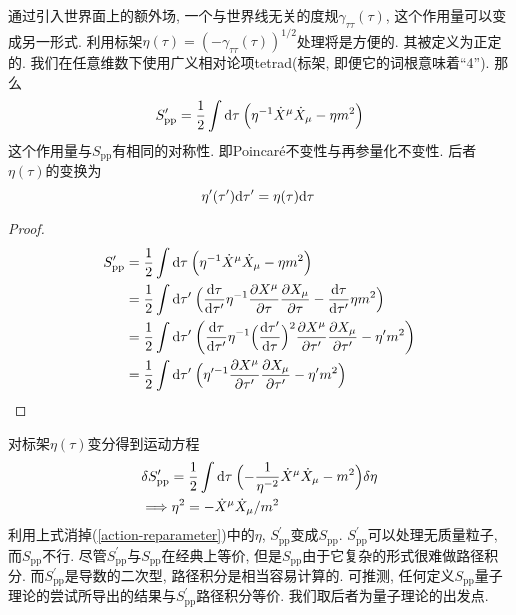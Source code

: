 通过引入世界面上的额外场, 一个与世界线无关的度规$\gamma_{\tau\tau}(\tau)$, 这个作用量可以变成另一形式. 利用标架$\eta(\tau)=(-\gamma_{\tau\tau}(\tau))^{1/2}$处理将是方便的. 其被定义为正定的. 我们在任意维数下使用广义相对论项tetrad(标架, 即便它的词根意味着``4''). 那么
\begin{equation}
S^\prime _{\mathrm{pp}}=\frac{1}{2}\int \mathrm{d}\tau\: \Bigl(\eta^{-1}\dot{X}^\mu \dot{X}_\mu-\eta m^2\Bigr) \label{action-reparameter}
\end{equation}
这个作用量与$S_{\mathrm{pp}}$有相同的对称性. 即Poincar\'{e}不变性与再参量化不变性. 后者$\eta(\tau)$的变换为
\begin{equation}
\eta^\prime(\tau^\prime)\mathrm{d}\tau^\prime=\eta(\tau)\mathrm{d}\tau\:
\end{equation}
\begin{proof}
    \begin{align*}
        S^\prime _{\mathrm{pp}}&=\frac{1}{2}\int \mathrm{d}\tau\: \Bigl(\eta^{-1}\dot{X}^\mu \dot{X}_\mu-\eta m^2\Bigr) \nonumber \\
        &=\frac{1}{2}\int \mathrm{d}\tau^\prime \:\Bigl(\frac{\mathrm{d}\tau}{\mathrm{d}\tau^\prime} \eta^{-1}\frac{\partial X^\mu}{\partial \tau} \frac{\partial X_\mu}{\partial \tau}-\frac{\mathrm{d}\tau}{\mathrm{d}\tau^\prime} \eta m^2\Bigr) \nonumber \\
        &=\frac{1}{2}\int \mathrm{d}\tau^\prime\: \biggl(\frac{\mathrm{d}\tau}{\mathrm{d}\tau^\prime} \eta^{-1}\Bigl(\frac{\mathrm{d}\tau^\prime}{\mathrm{d}\tau}\Bigr)^2\frac{\partial X^\mu}{\partial \tau^\prime} \frac{\partial X_\mu}{\partial \tau^\prime}- \eta^\prime m^2\biggr) \nonumber \\
        &=\frac{1}{2}\int \mathrm{d}\tau^\prime\: \Bigl(\eta^{\prime -1}\frac{\partial X^\mu}{\partial \tau^\prime} \frac{\partial X_\mu}{\partial \tau^\prime}- \eta^\prime m^2\Bigr) \nonumber
        \end{align*}
\end{proof}

对标架$\eta(\tau)$变分得到运动方程
\begin{align}
&\delta S_{\mathrm{pp}}^\prime =\frac{1}{2}\int \mathrm{d}\tau\:\Bigl(-\frac{1}{\eta^{-2}}\dot{X}^\mu\dot{X}_\mu-m^2\Bigr)\delta\eta \nonumber \\
&\Longrightarrow \eta^2=-\dot{X}^\mu\dot{X}_\mu/m^2 \label{1.2.7}
\end{align}
利用上式消掉(\ref{action-reparameter})中的$\eta$, $S_{\mathrm{pp}}^\prime$变成$S_{\mathrm{pp}}$. 
$S_{\mathrm{pp}}^\prime$可以处理无质量粒子, 而$S_{\mathrm{pp}}$不行. 
尽管$S_{\mathrm{pp}}^\prime$与$S_{\mathrm{pp}}$在经典上等价, 但是$S_{\mathrm{pp}}$由于它复杂的形式很难做路径积分. 而$S_{\mathrm{pp}}^\prime$是导数的二次型, 路径积分是相当容易计算的. 可推测, 任何定义$S_{\mathrm{pp}}$量子理论的尝试所导出的结果与$S_{\mathrm{pp}}^\prime$路径积分等价. 我们取后者为量子理论的出发点. 

